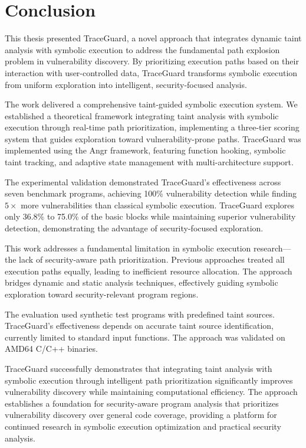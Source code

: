 \chapter{Conclusion}

This thesis presented TraceGuard, a novel approach that integrates dynamic taint analysis with symbolic execution to address the fundamental path explosion problem in vulnerability discovery. By prioritizing execution paths based on their interaction with user-controlled data, TraceGuard transforms symbolic execution from uniform exploration into intelligent, security-focused analysis.

The work delivered a comprehensive taint-guided symbolic execution system. We established a theoretical framework integrating taint analysis with symbolic execution through real-time path prioritization, implementing a three-tier scoring system that guides exploration toward vulnerability-prone paths. TraceGuard was implemented using the Angr framework, featuring function hooking, symbolic taint tracking, and adaptive state management with multi-architecture support.

The experimental validation demonstrated TraceGuard's effectiveness across seven benchmark programs, achieving 100\% vulnerability detection while finding $5 \times$ more vulnerabilities than classical symbolic execution. TraceGuard explores only 36.8\% to 75.0\% of the basic blocks while maintaining superior vulnerability detection, demonstrating the advantage of security-focused exploration.

This work addresses a fundamental limitation in symbolic execution research—the lack of security-aware path prioritization. Previous approaches treated all execution paths equally, leading to inefficient resource allocation. The approach bridges dynamic and static analysis techniques, effectively guiding symbolic exploration toward security-relevant program regions.

The evaluation used synthetic test programs with predefined taint sources. TraceGuard's effectiveness depends on accurate taint source identification, currently limited to standard input functions. The approach was validated on AMD64 C/C++ binaries.

TraceGuard successfully demonstrates that integrating taint analysis with symbolic execution through intelligent path prioritization significantly improves vulnerability discovery while maintaining computational efficiency. The approach establishes a foundation for security-aware program analysis that prioritizes vulnerability discovery over general code coverage, providing a platform for continued research in symbolic execution optimization and practical security analysis.
